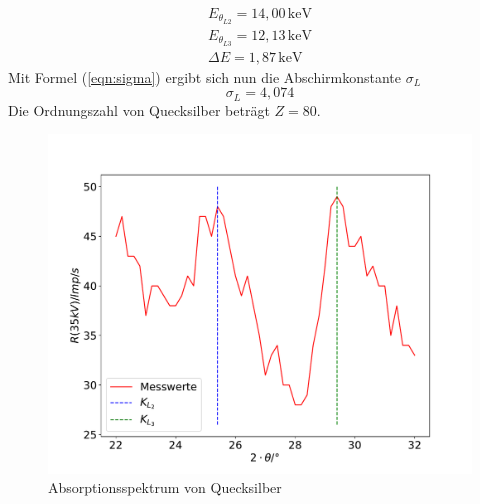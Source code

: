 \begin{align*}
E_{\theta_{L2}} = 14,00\,\mathrm{keV}\\
E_{\theta_{L3}} = 12,13\,\mathrm{keV}\\
\Delta E = 1,87\,\mathrm{keV}
\end{align*}
Mit Formel (\ref{eqn:sigma}) ergibt sich nun die Abschirmkonstante $\sigma_L$
\begin{equation*}
  \sigma_L = 4,074
\end{equation*}
Die Ordnungszahl von Quecksilber beträgt $Z=80$.
\begin{figure}
  \centering
  \includegraphics[width=\textwidth]{hg.pdf}
  \caption{Absorptionsspektrum von Quecksilber}
  \label{fig:hg}
\end{figure}

